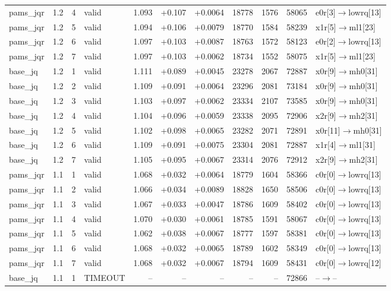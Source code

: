 \begin{tabular}{@{}llrlrrrrrrl@{}}
pams\_jqr & 1.2 & 4 & valid & 1.093 & +0.107 & +0.0064 & 18778 & 1576 & 58065 & e0r[3]$\to$lowrq[13] \\
pams\_jqr & 1.2 & 5 & valid & 1.094 & +0.106 & +0.0079 & 18770 & 1584 & 58239 & x1r[5]$\to$ml1[23] \\
pams\_jqr & 1.2 & 6 & valid & 1.097 & +0.103 & +0.0087 & 18763 & 1572 & 58123 & e0r[2]$\to$lowrq[13] \\
pams\_jqr & 1.2 & 7 & valid & 1.097 & +0.103 & +0.0062 & 18734 & 1552 & 58075 & x1r[5]$\to$ml1[23] \\
base\_jq & 1.2 & 1 & valid & 1.111 & +0.089 & +0.0045 & 23278 & 2067 & 72887 & x0r[9]$\to$mh0[31] \\
base\_jq & 1.2 & 2 & valid & 1.109 & +0.091 & +0.0064 & 23296 & 2081 & 73184 & x0r[9]$\to$mh0[31] \\
base\_jq & 1.2 & 3 & valid & 1.103 & +0.097 & +0.0062 & 23334 & 2107 & 73585 & x0r[9]$\to$mh0[31] \\
base\_jq & 1.2 & 4 & valid & 1.104 & +0.096 & +0.0059 & 23338 & 2095 & 72906 & x2r[9]$\to$mh2[31] \\
base\_jq & 1.2 & 5 & valid & 1.102 & +0.098 & +0.0065 & 23282 & 2071 & 72891 & x0r[11]$\to$mh0[31] \\
base\_jq & 1.2 & 6 & valid & 1.109 & +0.091 & +0.0075 & 23304 & 2081 & 72887 & x1r[4]$\to$ml1[31] \\
base\_jq & 1.2 & 7 & valid & 1.105 & +0.095 & +0.0067 & 23314 & 2076 & 72912 & x2r[9]$\to$mh2[31] \\
pams\_jqr & 1.1 & 1 & valid & 1.068 & +0.032 & +0.0064 & 18779 & 1604 & 58366 & c0r[0]$\to$lowrq[13] \\
pams\_jqr & 1.1 & 2 & valid & 1.066 & +0.034 & +0.0089 & 18828 & 1650 & 58506 & c0r[0]$\to$lowrq[13] \\
pams\_jqr & 1.1 & 3 & valid & 1.067 & +0.033 & +0.0047 & 18786 & 1609 & 58402 & c0r[0]$\to$lowrq[13] \\
pams\_jqr & 1.1 & 4 & valid & 1.070 & +0.030 & +0.0061 & 18785 & 1591 & 58067 & c0r[0]$\to$lowrq[13] \\
pams\_jqr & 1.1 & 5 & valid & 1.062 & +0.038 & +0.0067 & 18777 & 1597 & 58381 & c0r[0]$\to$lowrq[13] \\
pams\_jqr & 1.1 & 6 & valid & 1.068 & +0.032 & +0.0065 & 18789 & 1602 & 58349 & c0r[0]$\to$lowrq[13] \\
pams\_jqr & 1.1 & 7 & valid & 1.068 & +0.032 & +0.0067 & 18794 & 1609 & 58431 & c0r[0]$\to$lowrq[12] \\
base\_jq & 1.1 & 1 & TIMEOUT & -- & -- & -- & -- & -- & 72866 & --$\to$-- \\

\end{tabular}
